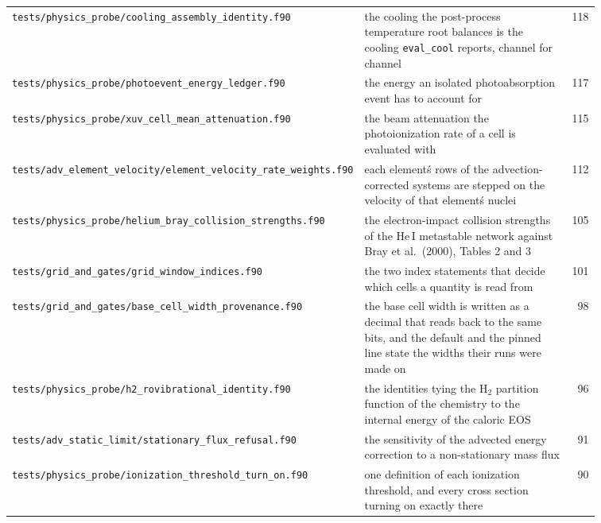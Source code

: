 {\begin{longtable}{@{}>{\raggedright\arraybackslash}p{0.36\linewidth} >{\raggedright\arraybackslash}p{0.50\linewidth} r@{}}
\texttt{tests/\allowbreak physics\_\allowbreak probe/\allowbreak cooling\_\allowbreak assembly\_\allowbreak identity.f90} & the cooling the post-process temperature root balances is the cooling \texttt{eval\_cool} reports, channel for channel & 118 \\
\texttt{tests/\allowbreak physics\_\allowbreak probe/\allowbreak photoevent\_\allowbreak energy\_\allowbreak ledger.f90} & the energy an isolated photoabsorption event has to account for & 117 \\
\texttt{tests/\allowbreak physics\_\allowbreak probe/\allowbreak xuv\_\allowbreak cell\_\allowbreak mean\_\allowbreak attenuation.f90} & the beam attenuation the photoionization rate of a cell is evaluated with & 115 \\
\texttt{tests/\allowbreak adv\_\allowbreak element\_\allowbreak velocity/\allowbreak element\_\allowbreak velocity\_\allowbreak rate\_\allowbreak weights.f90} & each element\'s rows of the advection-corrected systems are stepped on the velocity of that element\'s nuclei & 112 \\
\texttt{tests/\allowbreak physics\_\allowbreak probe/\allowbreak helium\_\allowbreak bray\_\allowbreak collision\_\allowbreak strengths.f90} & the electron-impact collision strengths of the He\,I metastable network against Bray et al.\ (2000), Tables 2 and 3 & 105 \\
\texttt{tests/\allowbreak grid\_\allowbreak and\_\allowbreak gates/\allowbreak grid\_\allowbreak window\_\allowbreak indices.f90} & the two index statements that decide which cells a quantity is read from & 101 \\
\texttt{tests/\allowbreak grid\_\allowbreak and\_\allowbreak gates/\allowbreak base\_\allowbreak cell\_\allowbreak width\_\allowbreak provenance.f90} & the base cell width is written as a decimal that reads back to the same bits, and the default and the pinned line state the widths their runs were made on & 98 \\
\texttt{tests/\allowbreak physics\_\allowbreak probe/\allowbreak h2\_\allowbreak rovibrational\_\allowbreak identity.f90} & the identities tying the H$_2$ partition function of the chemistry to the internal energy of the caloric EOS & 96 \\
\texttt{tests/\allowbreak adv\_\allowbreak static\_\allowbreak limit/\allowbreak stationary\_\allowbreak flux\_\allowbreak refusal.f90} & the sensitivity of the advected energy correction to a non-stationary mass flux & 91 \\
\texttt{tests/\allowbreak physics\_\allowbreak probe/\allowbreak ionization\_\allowbreak threshold\_\allowbreak turn\_\allowbreak on.f90} & one definition of each ionization threshold, and every cross section turning on exactly there & 90 \\

\end{longtable}}

